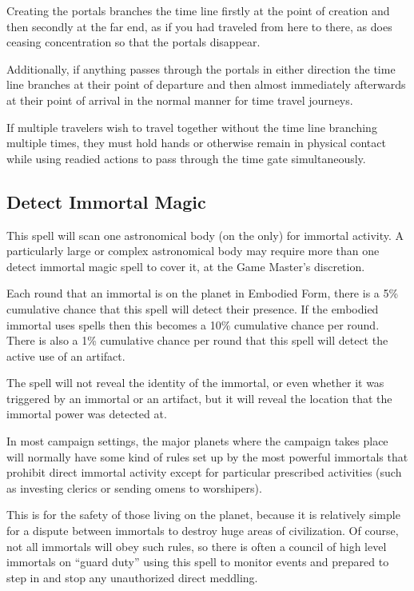 \begin{multicols*}{2}
Creating the portals branches the time line firstly at the point of creation and then secondly at the far end, as if you had traveled from here to there, as does ceasing concentration so that the portals disappear.

Additionally, if anything passes through the portals in either direction the time line branches at their point of departure and then almost immediately afterwards at their point of arrival in the normal manner for time travel journeys.

If multiple travelers wish to travel together without the time line branching multiple times, they must hold hands or otherwise remain in physical contact while using readied actions to pass through the time gate simultaneously.

\subsection{Detect Immortal Magic}

This spell will scan one astronomical body (on the  only) for immortal activity. A particularly large or complex astronomical body may require more than one detect immortal magic spell to cover it, at the Game Master’s discretion.

Each round that an immortal is on the planet in Embodied Form, there is a 5\% cumulative chance that this spell will detect their presence. If the embodied immortal uses spells then this becomes a 10\% cumulative chance per round. There is also a 1\% cumulative chance per round that this spell will detect the active use of an artifact.

The spell will not reveal the identity of the immortal, or even whether it was triggered by an immortal or an artifact, but it will reveal the location that the immortal power was detected at.

In most campaign settings, the major planets where the campaign takes place will normally have some kind of rules set up by the most powerful immortals that prohibit direct immortal activity except for particular prescribed activities (such as investing clerics or sending omens to worshipers).

This is for the safety of those living on the planet, because it is relatively simple for a dispute between immortals to destroy huge areas of civilization. Of course, not all immortals will obey such rules, so there is often a council of high level immortals on “guard duty” using this spell to monitor events and prepared to step in and stop any unauthorized direct meddling.


\end{multicols*}
